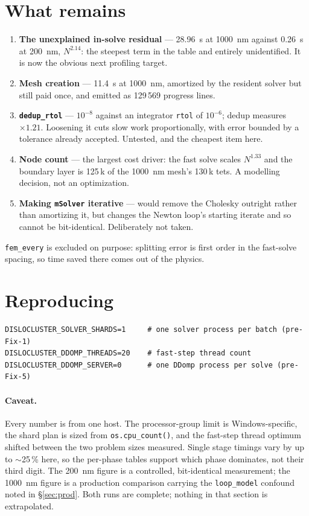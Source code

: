 \documentclass[11pt]{article}
\begin{document}
\section{What remains}
\begin{enumerate}
  \item \textbf{The unexplained in-solve residual} --- \SI{28.96}{\second} at
        \SI{1000}{\nano\meter} against \SI{0.26}{\second} at
        \SI{200}{\nano\meter}, $N^{2.14}$: the steepest term in the table and
        entirely unidentified. It is now the obvious next profiling target.
  \item \textbf{Mesh creation} --- \SI{11.4}{\second} at
        \SI{1000}{\nano\meter}, amortized by the resident solver but still paid
        once, and emitted as 129\,569 progress lines.
  \item \textbf{\texttt{dedup\_rtol}} --- $10^{-8}$ against an integrator
        \texttt{rtol} of $10^{-6}$; dedup measures $\times1.21$. Loosening it
        cuts slow work proportionally, with error bounded by a tolerance
        already accepted. Untested, and the cheapest item here.
  \item \textbf{Node count} --- the largest cost driver: the fast solve scales
        $N^{1.33}$ and the boundary layer is 125\,k of the
        \SI{1000}{\nano\meter} mesh's 130\,k tets. A modelling decision, not an
        optimization.
  \item \textbf{Making \texttt{mSolver} iterative} --- would remove the
        Cholesky outright rather than amortizing it, but changes the Newton
        loop's starting iterate and so cannot be bit-identical. Deliberately
        not taken.
\end{enumerate}

\noindent
\texttt{fem\_every} is excluded on purpose: splitting error is first order in
the fast-solve spacing, so time saved there comes out of the physics.

\section*{Reproducing}
\begin{lstlisting}
DISLOCLUSTER_SOLVER_SHARDS=1     # one solver process per batch (pre-Fix-1)
DISLOCLUSTER_DDOMP_THREADS=20    # fast-step thread count
DISLOCLUSTER_DDOMP_SERVER=0      # one DDomp process per solve (pre-Fix-5)
\end{lstlisting}

\paragraph{Caveat.} Every number is from one host. The processor-group limit is
Windows-specific, the shard plan is sized from \texttt{os.cpu\_count()}, and the
fast-step thread optimum shifted between the two problem sizes measured. Single
stage timings vary by up to $\sim$25\,\% here, so the per-phase tables support
which phase dominates, not their third digit. The \SI{200}{\nano\meter} figure
is a controlled, bit-identical measurement; the \SI{1000}{\nano\meter} figure
is a production comparison carrying the \texttt{loop\_model} confound noted in
\S\ref{sec:prod}. Both runs are complete; nothing in that section is
extrapolated.
\end{document}
